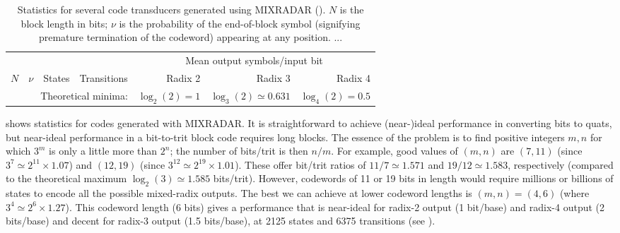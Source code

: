 \documentclass[english]{article}
\begin{document}
\begin{table}
\begin{tabular}{rrrrrrr}
& & & & \multicolumn{3}{c}{Mean output symbols/input bit} \\
\cline{5-7}
$N$ & $\nu$ & States & Transitions & Radix 2 & Radix 3 & Radix 4 \\
\hline

\hline
\multicolumn{4}{r}{Theoretical minima:} & $\log_2(2) = 1$ & $\log_3(2) \simeq 0.631$ & $\log_4(2) = 0.5$
\end{tabular}
\caption{
  Statistics for several code transducers generated using MIXRADAR ().
$N$ is the block length in bits; $\nu$ is the probability of the end-of-block symbol
(signifying premature termination of the codeword) appearing at any position.
...
}
\end{table}

 shows statistics for codes generated with MIXRADAR.
It is straightforward to achieve (near-)ideal performance in converting bits to quats,
but near-ideal performance in a bit-to-trit block code requires long blocks.
The essence of the problem is to find positive integers $m,n$ for which $3^m$ is only a little more than $2^n$;
the number of bits/trit is then $n/m$.
For example, good values of $(m,n)$ are $(7,11)$
(since $3^7 \simeq 2^{11} \times 1.07$)
and $(12,19)$ (since $3^{12} \simeq 2^{19} \times 1.01$).
These offer bit/trit ratios of $11/7 \simeq 1.571$ and $19/12 \simeq 1.583$, respectively
(compared to the theoretical maximum $\log_2(3) \simeq 1.585$ bits/trit).
However, codewords of 11 or 19 bits in length would require millions or billions of states to encode all the possible mixed-radix outputs.
The best we can achieve at lower codeword lengths is $(m,n) = (4,6)$ (where $3^4 \simeq 2^6 \times 1.27$).
This codeword length (6 bits) gives a performance that is near-ideal for radix-2 output (1 bit/base) and radix-4 output (2 bits/base)
and decent for radix-3 output (1.5 bits/base), at 2125 states and 6375 transitions (see ).
\end{document}
